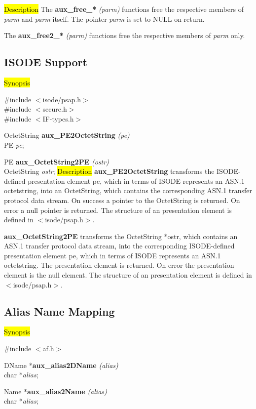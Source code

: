 \hl{Description}
The {\bf aux\_free\_*} {\em (parm)} functions free the respective members of {\em *parm}
and {\em *parm} itself. The pointer {\em *parm} is set to NULL on return.

The {\bf aux\_free2\_*} {\em (parm)} functions free the respective members of {\em parm}
only.

\subsection{ISODE Support}
\label{aux_isode}
\hl{Synopsis}

\#include $<$isode/psap.h$>$ \\
\#include $<$secure.h$>$ \\
\#include $<$IF-types.h$>$ 

OctetString {\bf *aux\_PE2OctetString} {\em  (pe)} \\
PE {\em pe};

PE {\bf aux\_OctetString2PE} {\em (ostr)} \\
OctetString {\em *ostr};
\hl{Description}
{\bf aux\_PE2OctetString}
transforms the ISODE-defined presentation element pe, which
in terms of ISODE represents an ASN.1 octetstring,
into an OctetString, which contains the corresponding ASN.1 transfer
protocol data stream.
On success a pointer to the OctetString is returned.
On error a null pointer is returned.
The structure of an presentation element is defined in $<$isode/psap.h$>$.

{\bf aux\_OctetString2PE}
transforms the OctetString *ostr, which contains an ASN.1 transfer
protocol data stream, into
the corresponding ISODE-defined presentation element pe, which
in terms of ISODE represents an ASN.1 octetstring.
The presentation element is returned.
On error the presentation element is the null element.
The structure of an presentation element is defined in $<$isode/psap.h$>$.

\subsection{Alias Name Mapping}
\label{aux_alias}
\hl{Synopsis}

\#include $<$af.h$>$ 

DName *{\bf aux\_alias2DName} {\em (alias)} \\
char *{\em alias}; 

Name *{\bf aux\_alias2Name} {\em (alias)} \\
char *{\em alias}; 


